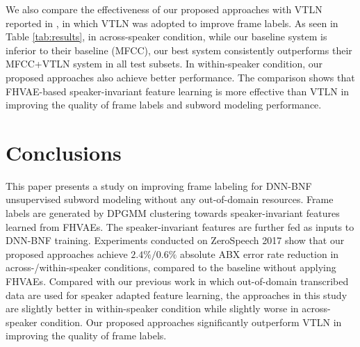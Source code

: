 \documentclass[a4paper]{article}
\begin{document}
We also compare the effectiveness of our proposed approaches with VTLN  reported in \cite{chen2017multilingual}, in which VTLN was adopted to improve frame labels. As seen in Table \ref{tab:results}, in across-speaker  condition, while our baseline system is inferior to their baseline (MFCC), our best system consistently  outperforms their MFCC+VTLN system in all test subsets. 
In within-speaker condition, our proposed approaches also achieve better performance.
The comparison shows that  FHVAE-based speaker-invariant feature learning is more effective than VTLN in improving the quality of frame labels and subword modeling performance.
\section{Conclusions}

This paper presents a study on improving frame labeling for  DNN-BNF unsupervised subword modeling without any out-of-domain resources.
Frame labels are generated by DPGMM clustering towards speaker-invariant features learned from FHVAEs.
The speaker-invariant features are further fed as inputs to DNN-BNF training.
Experiments conducted on ZeroSpeech 2017 show that our proposed approaches achieve $2.4\%/0.6\%$ absolute  ABX error rate reduction in across-/within-speaker conditions, compared to the baseline without applying FHVAEs.
Compared with our previous work in which out-of-domain transcribed data are used for speaker adapted feature learning, the approaches in this study are slightly better in within-speaker condition while slightly worse in across-speaker condition.
Our proposed approaches significantly outperform VTLN in improving the quality of frame labels.
\end{document}

